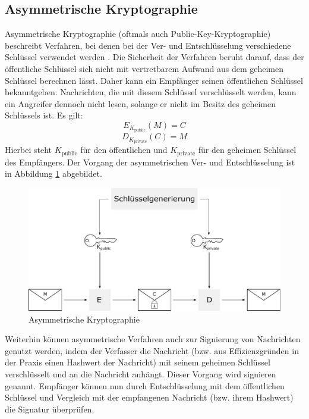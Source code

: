 \subsection{Asymmetrische Kryptographie}

Asymmetrische Kryptographie (oftmals auch Public-Key-Kryptographie) beschreibt Verfahren, bei denen bei der Ver- und Entschlüsselung verschiedene Schlüssel verwendet werden \cite{Schneier2006}. Die Sicherheit der Verfahren beruht darauf, dass der öffentliche Schlüssel sich nicht mit vertretbarem Aufwand aus dem geheimen Schlüssel berechnen lässt. Daher kann ein Empfänger seinen öffentlichen Schlüssel bekanntgeben. Nachrichten, die mit diesem Schlüssel verschlüsselt werden, kann ein Angreifer dennoch nicht lesen, solange er nicht im Besitz des geheimen Schlüssels ist. Es gilt: 
\[E_{K_{\text{public}}}(M)=C\] 
\[D_{K_{\text{private}}}(C)=M\] 
Hierbei steht \(K_{\text{public}}\) für den öffentlichen und \(K_{\text{private}}\) für den geheimen Schlüssel des Empfängers. Der Vorgang der asymmetrischen Ver- und Entschlüsselung ist in Abbildung \ref{fig_asymmetric_encryption} abgebildet.

\begin{figure}
	\centering
	\includegraphics[width=15cm]{Diagrams/AsymmetricEncryption.pdf} %
	\caption{Asymmetrische Kryptographie}
	\label{fig_asymmetric_encryption}
\end{figure}

Weiterhin können asymmetrische Verfahren auch zur Signierung von Nachrichten genutzt werden, indem der Verfasser die Nachricht (bzw. aus Effizienzgründen in der Praxis einen Hashwert der Nachricht) mit seinem geheimen Schlüssel verschlüsselt und an die Nachricht anhängt. Dieser Vorgang wird signieren genannt. Empfänger können nun durch Entschlüsselung mit dem öffentlichen Schlüssel und Vergleich mit der empfangenen Nachricht (bzw. ihrem Hashwert) die Signatur überprüfen. 

